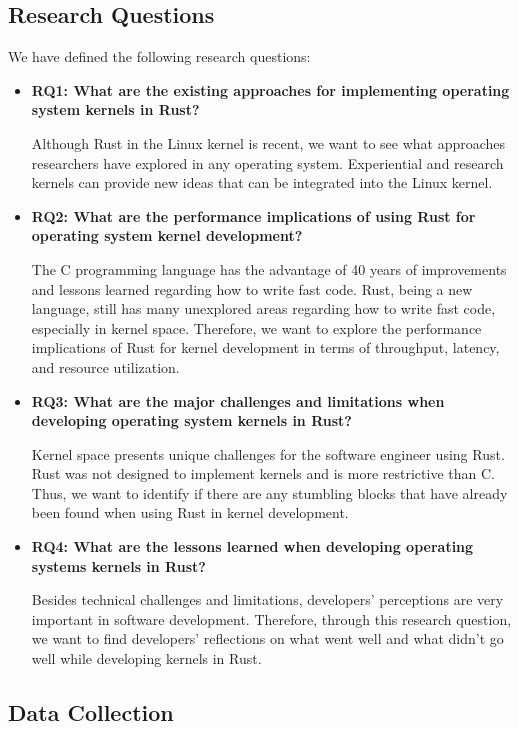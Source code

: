 \documentclass[sigconf]{acmart}
\begin{document}
\subsection{Research Questions}
\label{sec:researchQuestions}

We have defined the following research questions:

\begin{itemize}
    \item \textbf{RQ1: What are the existing approaches for implementing operating system kernels in Rust?}
    
    Although Rust in the Linux kernel is recent, we want to see what approaches researchers have explored in any operating system. Experiential and research kernels can provide new ideas that can be integrated into the Linux kernel.
    \item \textbf{RQ2: What are the performance implications of using Rust for operating system kernel development?}

    The C programming language has the advantage of 40 years of improvements and lessons learned regarding how to write fast code. Rust, being a new language, still has many unexplored areas regarding how to write fast code, especially in kernel space. Therefore, we want to explore the performance implications of Rust for kernel development in terms of throughput, latency, and resource utilization.
    \item \textbf{RQ3: What are the major challenges and limitations when developing operating system kernels in Rust?}%

      Kernel space presents unique challenges for the software engineer using Rust. Rust was not designed to implement kernels and is more restrictive than C. Thus, we want to identify if there are any stumbling blocks that have already been found when using Rust in kernel development.
    \item \textbf{RQ4: What are the lessons learned when developing operating systems kernels in Rust?}

    Besides technical challenges and limitations, developers' perceptions are very important in software development. Therefore, through this research question, we want to find developers' reflections on what went well and what didn't go well while developing kernels in Rust.
\end{itemize}

\subsection{Data Collection}
\end{document}
